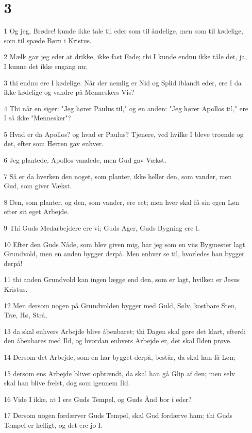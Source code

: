 \chapter{3}

\par 1 Og jeg, Brødre! kunde ikke tale til eder som til åndelige, men som til kødelige, som til spæde Børn i Kristus.
\par 2 Mælk gav jeg eder at drikke, ikke fast Føde; thi I kunde endnu ikke tåle det, ja, I kunne det ikke engang nu;
\par 3 thi endnu ere I kødelige. Når der nemlig er Nid og Splid iblandt eder, ere I da ikke kødelige og vandre på Menneskers Vis?
\par 4 Thi når en siger: "Jeg hører Paulus til," og en anden: "Jeg hører Apollos til," ere I så ikke "Mennesker"?
\par 5 Hvad er da Apollos? og hvad er Paulus? Tjenere, ved hvilke I bleve troende og det, efter som Herren gav enhver.
\par 6 Jeg plantede, Apollos vandede, men Gud gav Vækst.
\par 7 Så er da hverken den noget, som planter, ikke heller den, som vander, men Gud, som giver Vækst.
\par 8 Den, som planter, og den, som vander, ere eet; men hver skal få sin egen Løn efter sit eget Arbejde.
\par 9 Thi Guds Medarbejdere ere vi; Guds Ager, Guds Bygning ere I.
\par 10 Efter den Guds Nåde, som blev given mig, har jeg som en viis Bygmester lagt Grundvold, men en anden bygger derpå. Men enhver se til, hvorledes han bygger derpå!
\par 11 thi anden Grundvold kan ingen lægge end den, som er lagt, hvilken er Jesus Kristus.
\par 12 Men dersom nogen på Grundvolden bygger med Guld, Sølv, kostbare Sten, Træ, Hø, Strå,
\par 13 da skal enhvers Arbejde blive åbenbaret; thi Dagen skal gøre det klart, efterdi den åbenbares med Ild, og hvordan enhvers Arbejde er, det skal Ilden prøve.
\par 14 Dersom det Arbejde, som en har bygget derpå, består, da skal han få Løn;
\par 15 dersom ens Arbejde bliver opbrændt, da skal han gå Glip af den; men selv skal han blive frelst, dog som igennem Ild.
\par 16 Vide I ikke, at I ere Guds Tempel, og Guds Ånd bor i eder?
\par 17 Dersom nogen fordærver Guds Tempel, skal Gud fordærve ham; thi Guds Tempel er helligt, og det ere jo I.
